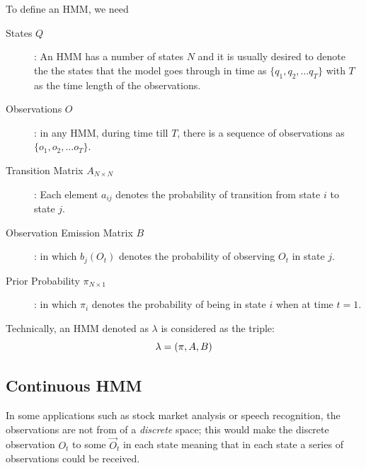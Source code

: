 \documentclass{acm_proc_article-sp}
\begin{document}
To define an HMM, we need
\begin{description}
\item[States $Q$]: An HMM has a number of states $N$ and it is usually desired to denote the the states that the model
goes through in time as $\{q_1, q_2, \ldots q_T\}$ with $T$ as the time length of the observations.
\item[Observations $O$]: in any HMM, during time till $T$, there is a sequence of observations as $\{o_1, o_2, \ldots
o_T\}$.
\item[Transition Matrix $A_{N \times N}$]: Each element $a_{ij}$ denotes the probability of transition from state $i$
to state $j$.
\item[Observation Emission Matrix $B$]: in which $b_j(O_t)$ denotes the probability of observing $O_t$ in
state $j$.
\item[Prior Probability $\pi_{N \times 1}$]: in which $\pi_i$ denotes the probability of being in state $i$ when at
time $t = 1$.
\end{description}
Technically, an HMM denoted as $\lambda$ is considered as the triple:
\begin{equation}
\boldmath{\lambda = (\pi, A, B)}
\end{equation}

\subsection{Continuous HMM}
In some applications such as stock market analysis or speech recognition, the observations are not from of a
\textit{discrete} space; this would make the discrete observation $O_t$ to some $\vec{O}_t$ in each state meaning that
in each state a series of observations could be received.
\end{document}
